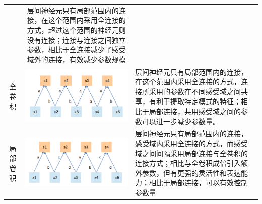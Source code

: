 \begin{longtable}[]{@{}ccl@{}}
\begin{minipage}[t]{0.08\columnwidth}
\end{minipage} & \begin{minipage}[t]{0.06\columnwidth}\raggedright\strut
层间神经元只有局部范围内的连接，在这个范围内采用全连接的方式，超过这个范围的神经元则没有连接；连接与连接之间独立参数，相比于全连接减少了感受域外的连接，有效减少参数规模\strut
\end{minipage}\tabularnewline
\begin{minipage}[t]{0.11\columnwidth}\centering\strut
全卷积\strut
\end{minipage} & \begin{minipage}[t]{0.08\columnwidth}\centering\strut
\includegraphics{img/ch5/conv.png}\strut
\end{minipage} & \begin{minipage}[t]{0.06\columnwidth}\raggedright\strut
层间神经元只有局部范围内的连接，在这个范围内采用全连接的方式，连接所采用的参数在不同感受域之间共享，有利于提取特定模式的特征；相比于局部连接，共用感受域之间的参数可以进一步减少参数量。\strut
\end{minipage}\tabularnewline
\begin{minipage}[t]{0.11\columnwidth}\centering\strut
局部卷积\strut
\end{minipage} & \begin{minipage}[t]{0.08\columnwidth}\centering\strut
\includegraphics{img/ch5/local-conv.png}\strut
\end{minipage} & \begin{minipage}[t]{0.06\columnwidth}\raggedright\strut
层间神经元只有局部范围内的连接，感受域内采用全连接的方式，而感受域之间间隔采用局部连接与全卷积的连接方式；相比与全卷积成倍引入额外参数，但有更强的灵活性和表达能力；相比于局部连接，可以有效控制参数量\strut
\end{minipage}\tabularnewline
\bottomrule
\end{longtable}

